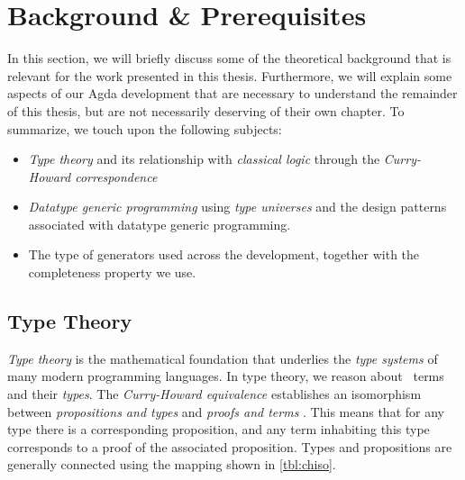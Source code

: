 \documentclass[a4paper,msc,twosized=semi]{uustthesis}
\begin{document}
\chapter{Background \& Prerequisites}
In this section, we will briefly discuss some of the theoretical background that is relevant for the work presented in this thesis. Furthermore, we will explain some aspects of our Agda development that are necessary to understand the remainder of this thesis, but are not necessarily deserving of their own chapter. To summarize, we touch upon the following subjects:

\begin{itemize}
  \item
    \emph{Type theory} and its relationship with \emph{classical logic} through the 
    \emph{Curry-Howard correspondence}

  \item 
    \emph{Datatype generic programming} using \emph{type universes} and the design 
    patterns associated with datatype generic programming.  

  \item 
    The type of generators used across the development, together with the completeness property we use. 

\end{itemize}

\section{Type Theory}

  \emph{Type theory} is the mathematical foundation that underlies the \emph{type 
  systems} of many modern programming languages. In type theory, we reason about \emph\
  {terms} and their \emph{types}. The \emph{Curry-Howard equivalence} establishes an isomorphism between \emph
  {propositions and types} and \emph{proofs and terms} \cite{wadler2015propositions}. 
  This means that for any type there is a corresponding proposition, and any term 
  inhabiting this type corresponds to a proof of the associated proposition. Types and 
  propositions are generally connected using the mapping shown in \cref{tbl:chiso}.
\end{document}
